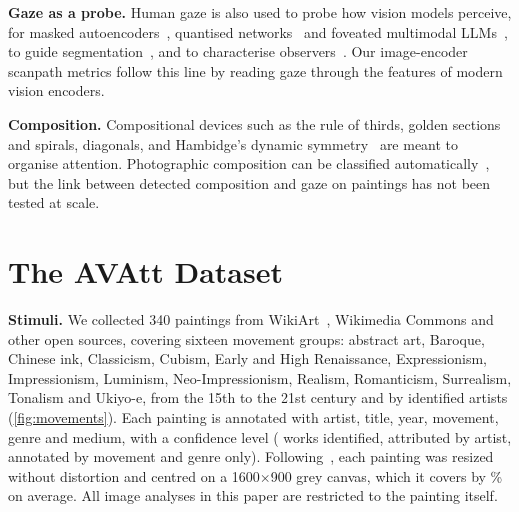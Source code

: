 \documentclass[10pt,twocolumn,letterpaper]{article}
\newcommand{\avatt}{AVAtt}
\newcommand{\mypara}[1]{\vspace{2pt}\noindent\textbf{#1}\hspace{0.5em}}
\begin{document}
\mypara{Gaze as a probe.} Human gaze is also used to probe how vision models perceive, for masked
autoencoders~\cite{tliba2024mae}, quantised networks~\cite{kerkouri2024quantization} and foveated multimodal
LLMs~\cite{kerkouri2026foveated}, to guide segmentation~\cite{benyahia2026gazerefine}, and to characterise
observers~\cite{bruno2023cvd,wong2025shifts,kerkouri2026divergent}. Our image-encoder scanpath metrics follow this line
by reading gaze through the features of modern vision encoders.

\mypara{Composition.} Compositional devices such as the rule of thirds, golden sections and spirals, diagonals, and
Hambidge's dynamic symmetry~\cite{hambidge1926} are meant to organise attention. Photographic composition can be
classified automatically~\cite{lee2018kupcp,hong2021cacnet}, but the link between detected composition and gaze on
paintings has not been tested at scale.

\begin{table}[t]
  \centering
  \caption{Comparison with public free-viewing datasets.}
  \label{tab:compare}
\end{table}

\section{The \avatt{} Dataset}
\label{sec:dataset}

\mypara{Stimuli.} We collected 340 paintings from WikiArt~\cite{saleh2015wikiart}, Wikimedia Commons and other
open sources, covering sixteen movement groups: abstract art, Baroque, Chinese ink, Classicism, Cubism, Early
and High Renaissance, Expressionism, Impressionism, Luminism, Neo-Impressionism, Realism, Romanticism, Surrealism,
Tonalism and Ukiyo-e, from the 15th to the 21st century and by \nArtists{} identified artists
(\cref{fig:movements}). Each painting is annotated with artist, title, year, movement, genre and medium, with a
confidence level (\nMetaHigh{} works identified, \nMetaMedium{} attributed by artist, \nMetaLow{} annotated by movement
and genre only). Following~\cite{lemeur2020paintings}, each painting was resized without distortion and centred on a
1600$\times$900 grey canvas, which it covers by \paintingAreaPct\% on average. All image analyses in this paper are
restricted to the painting itself.
\end{document}
